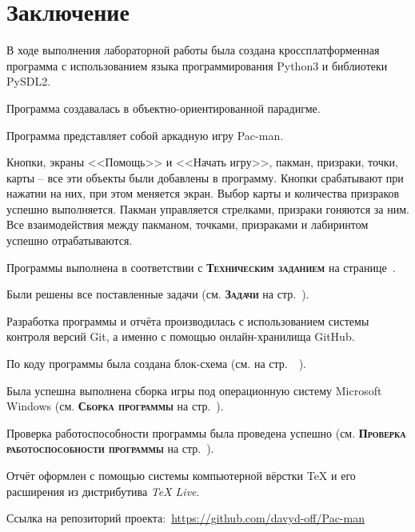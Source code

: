 \documentclass[14pt, oneside]{altsu-report}
\begin{document}

 

\chapter*{Заключение}
В ходе выполнения лабораторной работы была создана кроссплатформенная программа с использованием языка программирования Python3 и библиотеки PySDL2.

Программа создавалась в объектно-ориентированной парадигме.

Программа представляет собой аркадную игру Pac-man.

Кнопки, экраны <<Помощь>> и <<Начать игру>>, пакман, призраки, точки, карты -- все эти объекты были добавлены в программу. Кнопки срабатывают при нажатии на них, при этом меняется экран. Выбор карты и количества призраков успешно выполняется. Пакман управляется стрелками, призраки гоняются за ним. Все взаимодействия между пакманом, точками, призраками и лабиринтом успешно отрабатываются. 

Программы выполнена в соответствии с \textbf{\textsc{Техническим заданием}} на странице~\pageref{sec:ch01/sec01}.

Были решены все поставленные задачи (см. \textbf{\textsc{Задачи}} на стр.~\pageref{zadachi}).

Разработка программы и отчёта производилась с использованием системы контроля версий Git, а именно с помощью онлайн-хранилища GitHub.

По коду программы была создана блок-схема (см. на стр.~\pageref{fig7}~\pageref{fig8}).

Была успешна выполнена сборка игры под операционную систему Microsoft Windows (см. \textbf{\textsc{Сборка программы}} на стр.~\pageref{subsec:ch02/sec01/sub09}).

Проверка работоспособности программы была проведена успешно (см. \textbf{\textsc{Проверка работоспособности программы}} на стр.~\pageref{sec:ch02/sec02}).

Отчёт оформлен с помощью системы компьютерной вёрстки \TeX{} и его расширения \XeTeX{} из дистрибутива \textit{TeX Live}.

Ссылка на репозиторий проекта:~\textcolor{blue}{\url{https://github.com/davyd-off/Pac-man}}

\newpage
{}
\printbibliography[title={Список использованной литературы}]
\end{document}
